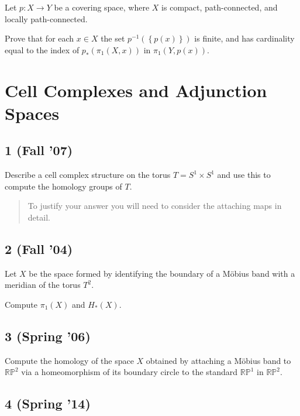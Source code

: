Let \(p : X \to Y\) be a covering space, where \(X\) is compact,
path-connected, and locally path-connected.

Prove that for each \(x \in X\) the set
\(p^{-1}(\left\{{p(x)}\right\})\) is finite, and has cardinality equal
to the index of \(p_* (\pi_1 (X, x))\) in \(\pi_1 (Y, p(x))\).

\hypertarget{cell-complexes-and-adjunction-spaces}{%
\section{Cell Complexes and Adjunction
Spaces}\label{cell-complexes-and-adjunction-spaces}}

\hypertarget{fall-07-2}{%
\subsection{1 (Fall '07)}\label{fall-07-2}}

Describe a cell complex structure on the torus \(T = S^1 \times S^1\)
and use this to compute the homology groups of \(T\).

\begin{quote}
To justify your answer you will need to consider the attaching maps in
detail.
\end{quote}

\hypertarget{fall-04-3}{%
\subsection{2 (Fall '04)}\label{fall-04-3}}

Let \(X\) be the space formed by identifying the boundary of a Möbius
band with a meridian of the torus \(T^2\).

Compute \(\pi_1 (X)\) and \(H_* (X)\).

\hypertarget{spring-06-3}{%
\subsection{3 (Spring '06)}\label{spring-06-3}}

Compute the homology of the space \(X\) obtained by attaching a Möbius
band to \({\mathbb{RP}}^2\) via a homeomorphism of its boundary circle
to the standard \({\mathbb{RP}}^1\) in \({\mathbb{RP}}^2\).

\hypertarget{spring-14}{%
\subsection{4 (Spring '14)}\label{spring-14}}

